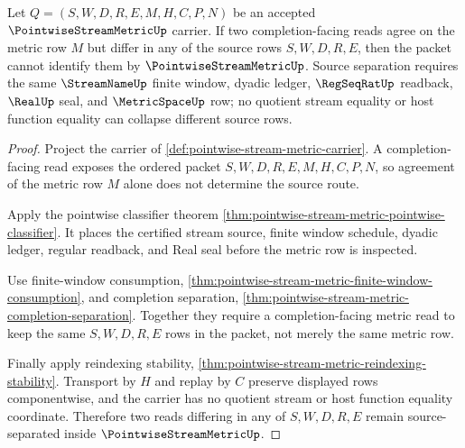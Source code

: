 \begin{theorem}
\label{thm:pointwise-stream-metric-source-separation}
Let $Q=(S,W,D,R,E,M,H,C,P,N)$ be an accepted $\PointwiseStreamMetricUp$ carrier. If two completion-facing reads agree on the metric row $M$ but differ in any of the source rows $S,W,D,R,E$, then the packet cannot identify them by $\PointwiseStreamMetricUp$. Source separation requires the same $\StreamNameUp$ finite window, dyadic ledger, $\RegSeqRatUp$ readback, $\RealUp$ seal, and $\MetricSpaceUp$ row; no quotient stream equality or host function equality can collapse different source rows.
\end{theorem}
\begin{proof}
Project the carrier of \autoref{def:pointwise-stream-metric-carrier}. A completion-facing read exposes the ordered packet $S,W,D,R,E,M,H,C,P,N$, so agreement of the metric row $M$ alone does not determine the source route.

Apply the pointwise classifier theorem \autoref{thm:pointwise-stream-metric-pointwise-classifier}. It places the certified stream source, finite window schedule, dyadic ledger, regular readback, and Real seal before the metric row is inspected.

Use finite-window consumption, \autoref{thm:pointwise-stream-metric-finite-window-consumption}, and completion separation, \autoref{thm:pointwise-stream-metric-completion-separation}. Together they require a completion-facing metric read to keep the same $S,W,D,R,E$ rows in the packet, not merely the same metric row.

Finally apply reindexing stability, \autoref{thm:pointwise-stream-metric-reindexing-stability}. Transport by $H$ and replay by $C$ preserve displayed rows componentwise, and the carrier has no quotient stream or host function equality coordinate. Therefore two reads differing in any of $S,W,D,R,E$ remain source-separated inside $\PointwiseStreamMetricUp$.
\end{proof}

